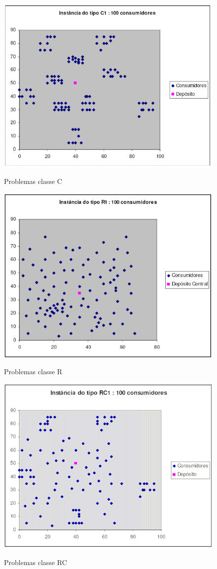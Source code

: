 \begin{figure}[ht!]
	\centering
	\includegraphics[scale=0.7]{figuras/solo1.PNG}
	\label{solo1}
	\caption{Problemas classe C}
\end{figure}

\begin{figure}[ht!]
	\centering
	\includegraphics[scale=0.7]{figuras/solo2.PNG}
	\label{solo2}
	\caption{Problemas classe R}
\end{figure}

\begin{figure}[ht!]
	\centering
	\includegraphics[scale=0.7]{figuras/solo3.PNG}
	\label{solo3}
	\caption{Problemas classe RC}
\end{figure}